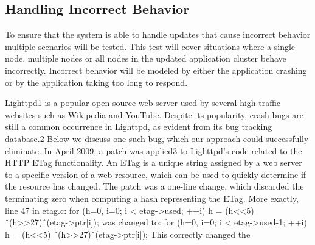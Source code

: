 \documentclass[a4paper,11pt,twoside]{report}
\begin{document}
   

  
   

   




\subsection{Handling Incorrect Behavior} 
To ensure that the system is able to handle updates that cause incorrect behavior multiple scenarios will be tested. This test will cover situations where a single node, multiple nodes or all nodes in the updated application cluster behave incorrectly. Incorrect behavior will be modeled by either the application crashing or by the application taking too long to respond.



Lighttpd1
is a popular open-source web-server used by
several high-traffic websites such as Wikipedia and YouTube.
Despite its popularity, crash bugs are still a common occurrence
in Lighttpd, as evident from its bug tracking database.2
Below we discuss one such bug, which our approach could
successfully eliminate.
In April 2009, a patch was applied3
to Lighttpd’s code related
to the HTTP ETag functionality. An ETag is a unique string
assigned by a web server to a specific version of a web resource,
which can be used to quickly determine if the resource has
changed. The patch was a one-line change, which discarded
the terminating zero when computing a hash representing the
ETag. More exactly, line 47 in etag.c:
for (h=0, i=0; i < etag->used; ++i) h = (h<<5)
ˆ(h>>27)ˆ(etag->ptr[i]);
was changed to:
for (h=0, i=0; i < etag->used-1; ++i) h = (h<<5)
ˆ(h>>27)ˆ(etag->ptr[i]);
This correctly changed the
\end{document}
